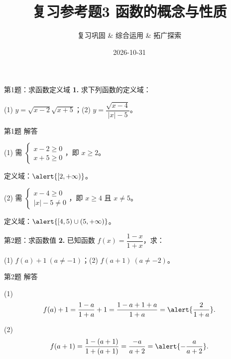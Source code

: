 \documentclass[10pt,aspectratio=169,serif,fleqn]{beamer}
\title[复习参考题3]{复习参考题3 \quad 函数的概念与性质}
\subtitle{复习巩固 \& 综合运用 \& 拓广探索}
\author{}
\institute{}
\date{2026-10-31}
\begin{document}
\begin{frame}
  \titlepage
\end{frame}

\begin{frame}[t]{第1题：求函数定义域}
\textbf{1.} 求下列函数的定义域：

\vspace{0.5em}
(1) $y=\sqrt{x-2}\sqrt{x+5}$；\hfil (2) $y=\dfrac{\sqrt{x-4}}{|x|-5}$。
\end{frame}

\begin{frame}[t]{第1题 解答}
\begin{tcolorbox}[colback=orange!10,colframe=orange,title=\textbf{解}]
(1) 需 $\begin{cases}x-2\ge0\\ x+5\ge0\end{cases}$，即 $x\ge2$。

\vspace{0.3em}
定义域：$\alert{[2,+\infty)}$。

\vspace{0.8em}
(2) 需 $\begin{cases}x-4\ge0\\ |x|-5\ne0\end{cases}$，即 $x\ge4$ 且 $x\ne5$。

\vspace{0.3em}
定义域：$\alert{[4,5)\cup(5,+\infty)}$。
\end{tcolorbox}
\end{frame}

\begin{frame}[t]{第2题：求函数值}
\textbf{2.} 已知函数 $f(x)=\dfrac{1-x}{1+x}$，求：

\vspace{0.5em}
(1) $f(a)+1\ (a\ne-1)$；\hfil (2) $f(a+1)\ (a\ne-2)$。
\end{frame}

\begin{frame}[t]{第2题 解答}
\begin{tcolorbox}[colback=orange!10,colframe=orange,title=\textbf{解}]
(1)
\[
f(a)+1=\frac{1-a}{1+a}+1=\frac{1-a+1+a}{1+a}=\alert{\frac{2}{1+a}}.
\]

\vspace{0.8em}
(2)
\[
f(a+1)=\frac{1-(a+1)}{1+(a+1)}=\frac{-a}{a+2}=\alert{-\frac{a}{a+2}}.
\]
\end{tcolorbox}
\end{frame}
\end{document}
